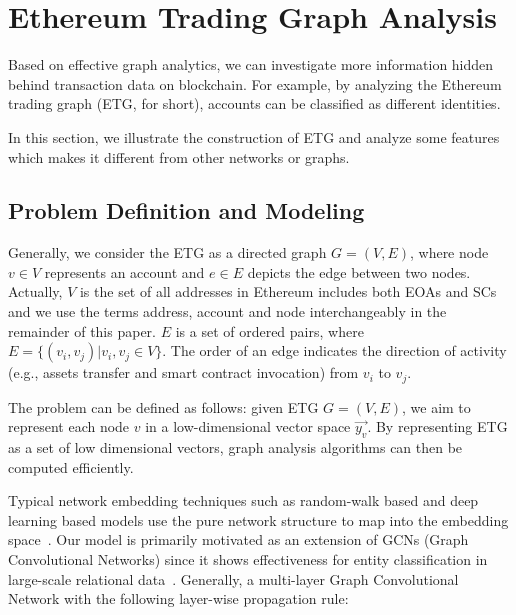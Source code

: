 
\section{Ethereum Trading Graph Analysis}
Based on effective graph analytics, we can investigate more information hidden behind transaction data on blockchain. For example, by analyzing the Ethereum trading graph (ETG, for short), accounts can be classified as different identities. 

In this section, we illustrate the construction of ETG and analyze some features which makes it different from other networks or graphs.



\subsection{Problem Definition and Modeling}
Generally, we consider the ETG as a directed graph $G=(V,E)$, where node $v \in V$ represents an account and $e \in E$ depicts the edge between two nodes. Actually, $V$ is the set of all addresses in Ethereum includes both EOAs and SCs and we use the terms address, account and node interchangeably in the remainder of this paper. $E$ is a set of ordered pairs, where $E=\{(v_i,v_j)|v_i,v_j \in V\}$. The order of an edge indicates the direction of activity (e.g., assets transfer and smart contract invocation) from $v_i$ to $v_j$.

The problem can be defined as follows: given ETG $G=(V,E)$, we aim to represent each node $v$ in a low-dimensional vector space $\vec{y_v}$. By representing ETG as a set of low dimensional vectors, graph analysis algorithms can then be computed efficiently. 

Typical network embedding techniques such as random-walk based and deep learning based models use the pure network structure to map into the embedding space~\cite{goyal2018capturing}. Our model is primarily motivated as an extension of GCNs (Graph Convolutional Networks) since it shows effectiveness for entity classification in large-scale relational data~\cite{kipf2016semi}. Generally, a multi-layer Graph Convolutional Network with the following layer-wise propagation rule:

